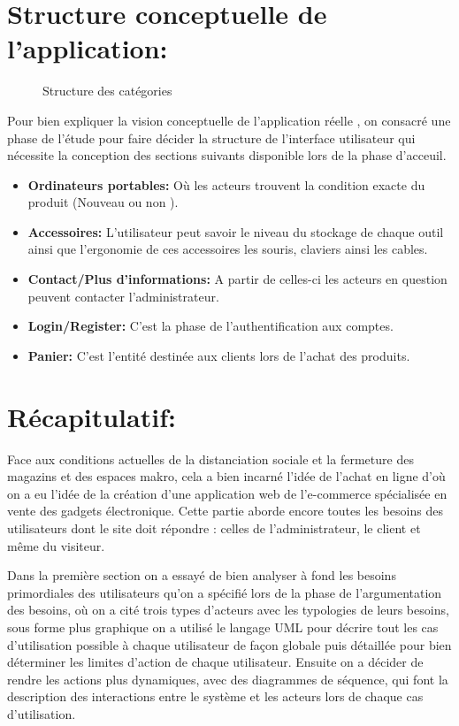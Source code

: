 \documentclass[a4paper]{report}
\begin{document}
\begin{doublespace}
	\section{Structure conceptuelle de l'application:}
	\begin{figure}[H]
		\begin{center}
			\caption{Structure des catégories}
		\end{center}
	\end{figure}
	Pour bien expliquer la vision conceptuelle de l'application
	réelle , on consacré une phase de l'étude pour faire décider la structure de
	l'interface utilisateur  qui nécessite la conception des  sections suivants
	disponible lors de la phase d'acceuil.
	\begin{itemize}
		\item \textbf{Ordinateurs portables:} Où les acteurs
		      trouvent la condition exacte du produit (Nouveau ou non ).
		\item \textbf{Accessoires:} L'utilisateur peut savoir
		      le niveau du stockage de chaque outil ainsi que l'ergonomie de ces accessoires
		      les souris, claviers ainsi les cables.
		\item \textbf{Contact/Plus d'informations:} A partir de
		      celles-ci les acteurs en question peuvent contacter l'administrateur.
		\item \textbf{Login/Register:} C'est la phase de
		      l'authentification aux comptes.
		\item \textbf{Panier:} C'est l'entité destinée aux
		      clients lors de l'achat des produits.
		      
	\end{itemize}
	
	\newpage
	\section{Récapitulatif:}
	Face aux conditions actuelles de la distanciation sociale
	et la fermeture des magazins et des espaces makro, cela a bien incarné l'idée
	de l'achat en ligne d'où on a eu l'idée de la création d’une application web de
	l'e-commerce spécialisée en vente des gadgets électronique. Cette partie aborde
	encore toutes les besoins des utilisateurs dont le site doit répondre : celles
	de l’administrateur, le client	et même du visiteur.
	
	Dans la première section on a essayé de bien analyser à
	fond les besoins primordiales des utilisateurs qu'on a spécifié lors de la
	phase de l'argumentation des besoins, où on a cité trois types d'acteurs avec
	les typologies de leurs besoins, sous forme plus graphique on a utilisé le
	langage UML pour décrire tout les cas d'utilisation possible à chaque
	utilisateur de façon globale puis  détaillée pour bien déterminer les limites
	d'action de chaque utilisateur.
	Ensuite on a décider de rendre les actions plus dynamiques,
	avec des diagrammes de séquence, qui font la description des interactions entre
	le système et les acteurs lors de chaque cas d'utilisation.
	

\end{doublespace}
\end{document}
